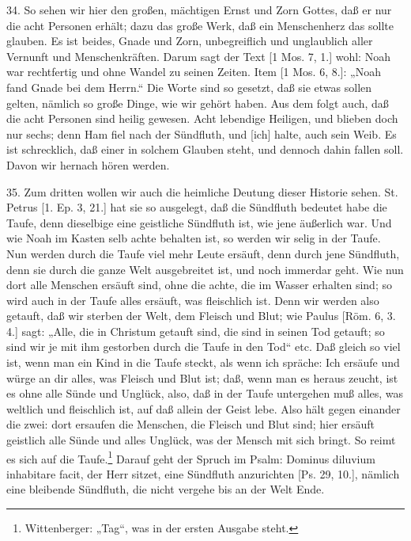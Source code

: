 34. So sehen wir hier den großen, mächtigen Ernst und Zorn Gottes, daß er nur die acht Personen erhält; dazu das große Werk, daß ein Menschenherz das sollte glauben. Es ist beides, Gnade und Zorn, unbegreiflich und unglaublich aller Vernunft und Menschenkräften. Darum sagt der Text [1 Mos. 7, 1.] wohl: Noah war rechtfertig und ohne Wandel zu seinen Zeiten. Item [1 Mos. 6, 8.]: „Noah fand Gnade bei dem Herrn.“ Die Worte sind so gesetzt, daß sie etwas sollen gelten, nämlich so große Dinge, wie wir gehört haben. Aus dem folgt auch, daß die acht Personen sind heilig gewesen. Acht lebendige Heiligen, und blieben doch nur sechs; denn Ham fiel nach der Sündfluth, und [ich] halte, auch sein Weib. Es ist schrecklich, daß einer in solchem Glauben steht, und dennoch dahin fallen soll. Davon wir hernach hören werden.

35. Zum dritten wollen wir auch die heimliche Deutung dieser Historie sehen. St. Petrus [1. Ep. 3, 21.] hat sie so ausgelegt, daß die Sündfluth bedeutet habe die Taufe, denn dieselbige eine geistliche Sündfluth ist, wie jene äußerlich war. Und wie Noah im Kasten selb achte behalten ist, so werden wir selig in der Taufe. Nun werden durch die Taufe viel mehr Leute ersäuft, denn durch jene Sündfluth, denn sie durch die ganze Welt ausgebreitet ist, und noch immerdar geht. Wie nun dort alle Menschen ersäuft sind, ohne die achte, die im Wasser erhalten sind; so wird auch in der Taufe alles ersäuft, was fleischlich ist. Denn wir werden also getauft, daß wir sterben der Welt, dem Fleisch und Blut; wie Paulus [Röm. 6, 3. 4.] sagt: „Alle, die in Christum getauft sind, die sind in seinen Tod getauft; so sind wir je mit ihm gestorben durch die Taufe in den Tod“ etc. Daß gleich so viel ist, wenn man ein Kind in die Taufe steckt, als wenn ich spräche: Ich ersäufe und würge an dir alles, was Fleisch und Blut ist; daß, wenn man es heraus zeucht, ist es ohne alle Sünde und Unglück, also, daß in der Taufe untergehen muß alles, was weltlich und fleischlich ist, auf daß allein der Geist lebe. Also hält gegen einander die zwei: dort ersaufen die Menschen, die Fleisch und Blut sind; hier ersäuft geistlich alle Sünde und alles Unglück, was der Mensch mit sich bringt. So reimt es sich auf die Taufe.\footnote{Wittenberger: „Tag“, was in der ersten Ausgabe steht.} Darauf geht der Spruch im Psalm: Dominus diluvium inhabitare facit,
der Herr sitzet, eine Sündfluth anzurichten [Ps. 29, 10.], nämlich eine bleibende Sündfluth, die nicht vergehe bis an der Welt Ende.

